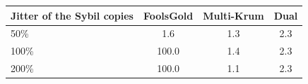 \begin{tabular}{lccc}
\toprule
Jitter of the Sybil copies & FoolsGold & Multi-Krum & Dual \\
\midrule
50\% & 1.6 & 1.3 & 2.3 \\
100\% & 100.0 & 1.4 & 2.3 \\
200\% & 100.0 & 1.1 & 2.3 \\
\bottomrule
\end{tabular}
